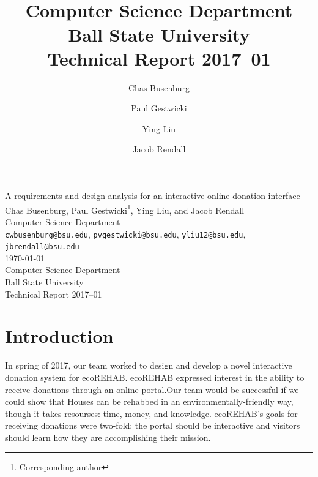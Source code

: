 \documentclass[letter]{article}
\title{\\
  Computer Science Department\\
  Ball State University\\
  Technical Report 2017--01}
\author{
  Chas Busenburg
  \and
  Paul Gestwicki
  \and
  Ying Liu
  \and
  Jacob Rendall}
\begin{document}
\begin{centering}
{\Large A requirements and design analysis for an interactive online donation interface}\\
\vspace{0.5cm}
Chas Busenburg, Paul Gestwicki\footnote{Corresponding author}, Ying Liu, and Jacob Rendall\\
Computer Science Department\\
\texttt{cwbusenburg@bsu.edu}, 
\texttt{pvgestwicki@bsu.edu},
\texttt{yliu12@bsu.edu},
\texttt{jbrendall@bsu.edu}\\
\vspace{0.5cm}
\today\\
\vspace{0.5cm}
Computer Science Department\\
Ball State University\\
Technical Report 2017--01\\
\end{centering}

\section*{Introduction}

In spring of 2017, our team worked to design and develop a novel interactive
donation system for ecoREHAB. ecoREHAB expressed interest in the ability
to receive donations through an online portal.Our team would be successful if we could
show that Houses can be rehabbed in an environmentally-friendly way, though it takes resourses:
time, money, and knowledge. ecoREHAB's goals for receiving donations were two-fold:
the portal should be interactive and visitors should learn how they are accomplishing their mission. 

\end{document}
